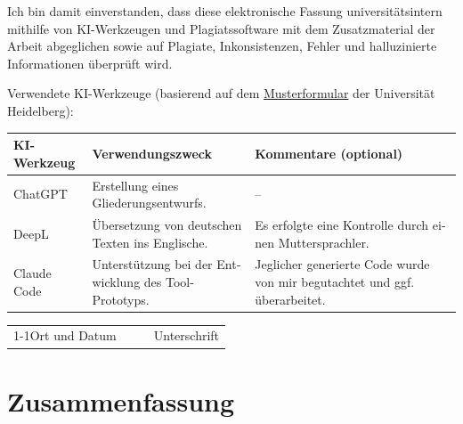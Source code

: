 \documentclass[
    pdftex,
    final,
    11pt,
    a4paper,
    parskip=false, %
    twoside, %
    footheight=0mm, %
    footinclude=false,
    toc=bibliography, %
    toc=listof %
]{scrbook} %
\begin{document}
\begin{otherlanguage}{ngerman}
Ich bin damit einverstanden, dass diese elektronische Fassung universitätsintern mithilfe von KI-Werkzeugen und Plagiatssoftware mit dem Zusatzmaterial der Arbeit abgeglichen sowie auf Plagiate, Inkonsistenzen, Fehler und halluzinierte Informationen überprüft wird.

\bigskip

Verwendete KI-Werkzeuge {\small(basierend auf dem \href{https://backend.heiskills.uni-heidelberg.de/de/dokumente/ki-formular-de/download}{Musterformular} der Universität Heidelberg)}:

\begin{center}
\small
\begin{tabularx}{\linewidth}{|l|X|X|}
\hline
\textbf{KI-Werkzeug} & \textbf{Verwendungszweck} & \textbf{Kommentare (optional)} \\
\hline
ChatGPT & Erstellung eines Gliederungsentwurfs. & -- \\
\hline
DeepL & Übersetzung von deutschen Texten ins Englische. & Es erfolgte eine Kontrolle durch einen Muttersprachler. \\ \hline
Claude Code & Unterstützung bei der Entwicklung des Tool-Prototyps. & Jeglicher generierte Code wurde von mir begutachtet und ggf. überarbeitet. \\
\hline
\end{tabularx} 
\end{center}

\vspace{2cm}
	
\noindent\begin{tabularx}{\textwidth}{XXXX}
	&&& \\
	\cline{1-1}\cline{4-4}\footnotesize\centering Ort und Datum		&&& \footnotesize\centering Unterschrift
\end{tabularx}
	
\newpage

\chapter*{Zusammenfassung}



\end{otherlanguage}
\end{document}
